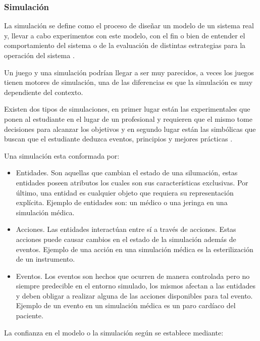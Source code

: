 \subsubsection{Simulación}

La simulación se define como el proceso de diseñar un modelo de un sistema real y, llevar a cabo experimentos con este modelo, con el fin o bien de entender el comportamiento del sistema o de la evaluación de distintas estrategias para la operación del sistema \cite{ingalls2008introduction}. 

Un juego y una simulación podrían llegar a ser muy parecidos, a veces los juegos tienen motores de simulación, una de las diferencias es que la simulación es muy dependiente del contexto. 

Existen dos tipos de simulaciones, en primer lugar están las experimentales que ponen al estudiante en el lugar de un profesional y requieren que el mismo tome decisiones para alcanzar los objetivos y en segundo lugar están las simbólicas que buscan que el estudiante deduzca eventos, principios y mejores prácticas \cite{charsky:2010}. 

Una simulación esta conformada por:

\begin{itemize}
\item Entidades. Son aquellas que cambian el estado de una silumación, estas entidades poseen atributos los cuales son sus características exclusivas. Por último, una entidad es cualquier objeto que requiera su representación explícita. Ejemplo de entidades son: un médico o una jeringa en una simulación médica.

\item Acciones. Las entidades interactúan entre sí a través de acciones. Estas acciones puede causar cambios en el estado de la simulación además de eventos. Ejemplo de una acción en una simulación médica es la esterilización de un instrumento.

\item Eventos. Los eventos son hechos que ocurren de manera controlada pero no siempre predecible en el entorno simulado, los mismos afectan a las entidades y deben obligar a realizar alguna de las acciones disponibles para tal evento. Ejemplo de un evento en un simulación médica es un paro cardíaco del paciente.

\end{itemize}

La confianza en el modelo o la simulación según \cite{DoDSysEng2001} se establece mediante:

